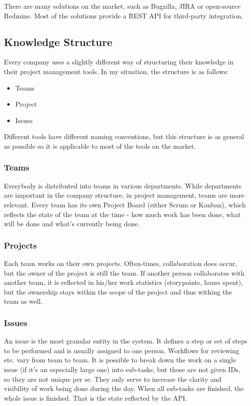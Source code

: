 There are many solutions on the market, such as Bugzilla, JIRA or open-source Redmine. Most of the solutions provide a REST API for third-party integration.

\subsection{Knowledge Structure}

Every company uses a slightly different way of structuring their knowledge in their project management tools. In my situation, the structure is as follows:

\begin{itemize}
	\item Teams
	\item Project
	\item Issues
\end{itemize}

Different tools have different naming conventions, but this structure is as general as possible so it is applicable to most of the tools on the market.

\subsubsection{Teams}

Everybody is distributed into teams in various departments. While departments are important in the company structure, in project management, teams are more relevant. Every team has its own Project Board (either Scrum or Kanban), which reflects the state of the team at the time - how much work has been done, what will be done and what's currently being done.

\subsubsection{Projects}

Each team works on their own projects. Often-times, collaboration does occur, but the owner of the project is still the team. If another person collaborates with another team, it is reflected in his/her work statistics (storypoints, hours spent), but the ownership stays within the scope of the project and thus withing the team as well.

\subsubsection{Issues}

An issue is the most granular entity in the system. It defines a step or set of steps to be performed and is usually assigned to one person. Workflows for reviewing etc. vary from team to team. It is possible to break down the work on a single issue (if it's an especially large one) into sub-tasks, but those are not given IDs, so they are not unique per se. They only serve to increase the clarity and visibility of work being done during the day. When all sub-tasks are finished, the whole issue is finished. That is the state reflected by the API.

